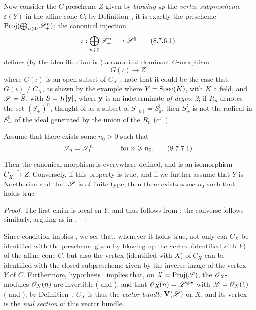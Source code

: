 \begin{env}[8.7.6]
\label{II.8.7.6}
Now consider the $C$-prescheme $Z$ given by \emph{blowing up} the \emph{vertex subprescheme $\varepsilon(Y)$} in the affine cone $C$;
by Definition~, it is exactly the prescheme $\operatorname{Proj}(\bigoplus_{n\geqslant0}\mathscr{S}_+^n)$;
the canonical injection
\[
\label{II.8.7.6.1}
  \iota: \bigoplus_{n\geq0} \sh{S}_+^n \to \sh{S}^\natural
\tag{8.7.6.1}
\]
defines (by the identification in ) a canonical dominant $C$-morphism
\[
\label{II.8.7.6.2}
  G(\iota)\to Z
  \tag{8.7.6.2}
\]
where $G(\iota)$ is an open subset of $C_X$ ;
note that it could be the case that $G(\iota)\neq C_X$, as shown by the example where $Y=\operatorname{Spec}(K)$, with $K$ a field, and $\mathscr{S}=\widetilde{S}$, with $S=K[\mathbf{y}]$, where $\mathbf{y}$ is an indeterminate \emph{of degree 2};
if $R_n$ denotes the set $(S_+)^n$, thought of as a subset of $S_{[n]}=S_n^\natural$, then $S_+^\natural$ is not the radical in $S_+^\natural$ of the ideal generated by the union of the $R_n$ (cf. ).
\end{env}

\begin{corollary}[8.7.7]
\label{II.8.7.7}
Assume that there exists some $n_0>0$ such that
\[
\label{II.8.7.7.1}
  \mathscr{S}_n=\mathscr{S}_1^n
  \qquad\qquad
  \text{for }n\geqslant n_0.
  \tag{8.7.7.1}
\]

Then the canonical morphism  is everywhere defined, and is an isomorphism $C_X\xrightarrow{\sim}Z$.
Conversely, if this property is true, and if we further assume that $Y$ is Noetherian and that $\mathscr{S}$ is of finite type, then there exists some $n_0$ such that  holds true.
\end{corollary}

\begin{proof}
\label{II.8.7.7}
The first claim is local on $Y$, and thus follows from ;
the converse follows similarly, arguing as in .
\end{proof}

\begin{remark}[8.7.8]
\label{II.8.7.8}
Since condition  implies , we see that, whenever it holds true, not only can $C_X$ be identified with the prescheme given by blowing up the vertex (identified with $Y$) of the affine cone $C$, but also the vertex (identified with $X$) of $C_X$ can be identified with the closed subprescheme given by the inverse image of the vertex $Y$ of $C$.
Furthermore, hypothesis~ implies that, on $X=\operatorname{Proj}(\mathscr{S})$, the $\mathscr{O}_X$-modules $\mathscr{O}_X(n)$ are invertible ( and ), and that $\mathscr{O}_X(n)=\mathscr{L}^{\otimes n}$ with $\mathscr{L}=\mathscr{O}_X(1)$ ( and );
by Definition~, $C_X$ is thus the \emph{vector bundle} $\mathbf{V}(\mathscr{L})$ on $X$, and its vertex is the \emph{null section} of this vector bundle.
\end{remark}

